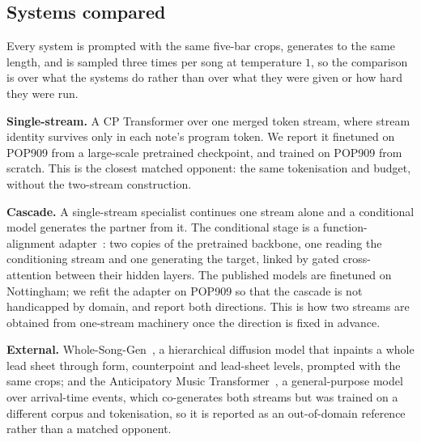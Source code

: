 \subsection{Systems compared}
\label{sec:systems}

Every system is prompted with the same five-bar crops, generates to
the same length, and is sampled three times per song at temperature
$1$, so the comparison is over what the systems do rather than over
what they were given or how hard they were run.

\textbf{Single-stream.} A CP Transformer over one merged token stream,
where stream identity survives only in each note's program token. We
report it finetuned on POP909 from a large-scale pretrained
checkpoint, and trained on POP909 from scratch. This is the closest
matched opponent: the same tokenisation and budget, without the
two-stream construction.

\textbf{Cascade.} A single-stream specialist continues one stream
alone and a conditional model generates the partner from it. The
conditional stage is a function-alignment adapter~\cite{yinyang}: two
copies of the pretrained backbone, one reading the conditioning stream
and one generating the target, linked by gated cross-attention between
their hidden layers. The published models are finetuned on Nottingham;
we refit the adapter on POP909 so that the cascade is not handicapped
by domain, and report both directions. This is how two streams are
obtained from one-stream machinery once the direction is fixed in
advance.

\textbf{External.} Whole-Song-Gen~\cite{whole_song}, a hierarchical
diffusion model that inpaints a whole lead sheet through form,
counterpoint and lead-sheet levels, prompted with the same crops; and
the Anticipatory Music Transformer~\cite{anticipatory}, a
general-purpose model over arrival-time events, which co-generates both
streams but was trained on a different corpus and tokenisation, so it
is reported as an out-of-domain reference rather than a matched
opponent.
